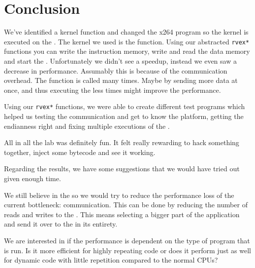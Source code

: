 \section{Conclusion}

We've identified a kernel function and changed the x264 program so the kernel
is executed on the \rvex. The kernel we used is the \satd function. Using our
abstracted \texttt{rvex*} functions you can write the instruction memory, write
and read the data memory and start the \rvex. Unfortunately we didn't see a
speedup, instead we even saw a decrease in performance. Assumably this is
because of the communication overhead. The \satd function is called many times.
Maybe by sending more data at once, and thus executing the \rvex less times
might improve the performance.

Using our \texttt{rvex*} functions, we were able to create different test
programs which helped us testing the communication and get to know the
platform, getting the endianness right and fixing multiple executions of the
\rvex.

All in all the lab was definitely fun. It felt really rewarding to hack
something together, inject some bytecode and see it working.

Regarding the results, we have some suggestions that we would have tried out
given enough time.

We still believe in the \rvex{} so we would try to reduce the performance loss
of the current bottleneck: communication. This can be done by reducing the
number of reads and writes to the \rvex{}. This means selecting a bigger part
of the application and send it over to the \rvex{} in its entirety.

We are interested in if the \rvex{} performance is dependent on the type of
program that is run. Is it more efficient for highly repeating code or does it
perform just as well for dynamic code with little repetition compared to the
normal CPUs?

